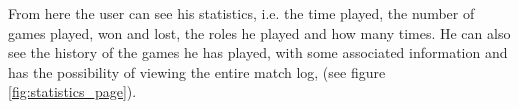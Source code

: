 From here the user can see his statistics, i.e. the time played, the number of games played, won and lost, the roles he played and how many times. He can also see the history of the games he has played, with some associated information and has the possibility of viewing the entire match log, (see figure \ref{fig:statistics_page}).